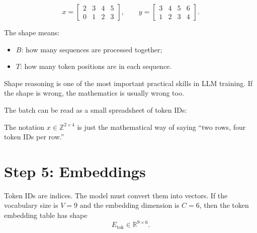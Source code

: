 \[
x =
\begin{bmatrix}
2 & 3 & 4 & 5 \\
0 & 1 & 2 & 3
\end{bmatrix},
\qquad
y =
\begin{bmatrix}
3 & 4 & 5 & 6 \\
1 & 2 & 3 & 4
\end{bmatrix}.
\]

The shape \shape{[B, T]} means:

\begin{itemize}
  \item \(B\): how many sequences are processed together;
  \item \(T\): how many token positions are in each sequence.
\end{itemize}

Shape reasoning is one of the most important practical skills in LLM training. If the shape is wrong, the mathematics is usually wrong too.

The batch can be read as a small spreadsheet of token IDs:

\begin{center}
\end{center}

The notation \(x \in \mathbb{Z}^{2 \times 4}\) is just the mathematical way of saying ``two rows, four token IDs per row.''

\section{Step 5: Embeddings}

Token IDs are indices. The model must convert them into vectors. If the vocabulary size is \(V=9\) and the embedding dimension is \(C=6\), then the token embedding table has shape
\[
E_{\text{tok}} \in \mathbb{R}^{9 \times 6}.
\]

